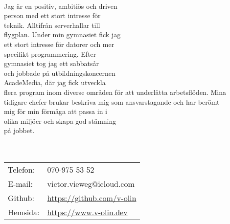 \documentclass[11pt,oneside,a4paper,titlepage]{article}
\begin{document}
\begin{tcolorbox}
    \begin{minipage}[t]{8cm}
        \vspace*{-18.2pt}
        \begin{tcolorbox}[grow to left by=15pt,colframe=sup-lgray,colback=sup-lgray,sharp corners]
            {\selectfont
                \\
                Jag är en positiv, ambitiös och driven\\
                person med ett stort intresse för\\
                teknik. Alltifrån serverhallar till\\
                flygplan. Under min gymnasiet fick jag\\
                ett stort intresse för datorer och mer\\
                specifikt programmering.
                Efter\\gymnasiet tog jag ett sabbatsår\\
                och jobbade på utbildningskoncernen\\
                AcadeMedia, där jag fick utveckla\\
                flera program inom diverse områden
                för att underlätta arbetsflöden. Mina\\
                tidigare chefer brukar beskriva
                mig som ansvarstagande och har berömt\\
                mig för min förmåga att passa in i\\
                olika miljöer och skapa god stämning\\
                på jobbet.\\\\
                \\
                \vspace*{15pt}
                \begin{tabular}{l l}
                    \\Telefon: & 070-975 53 52 \\
                    E-mail: & victor.vieweg@icloud.com \\
                    Github: & \href{https://github.com/v-olin}{https://github.com/v-olin} \\
                    Hemsida: & \href{https://www.v-olin.dev}{https://www.v-olin.dev} \\

\end{tabular}}
\end{tcolorbox}
\end{minipage}
\end{tcolorbox}
\end{document}
